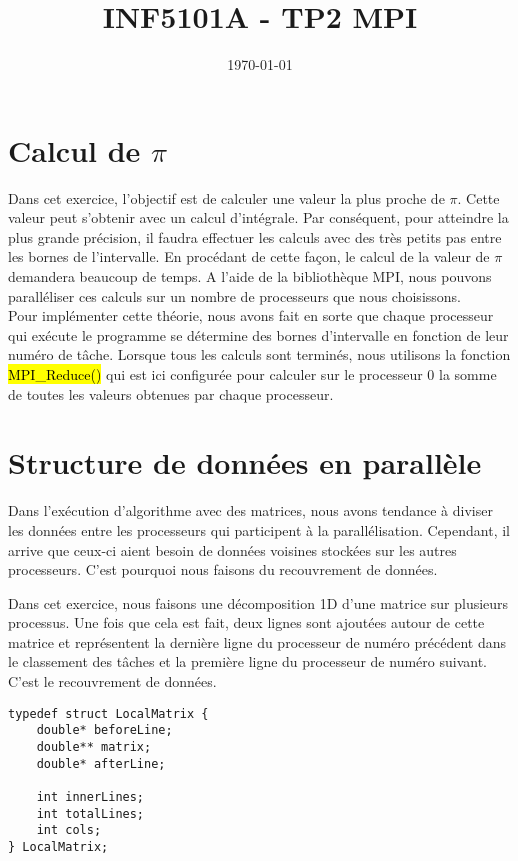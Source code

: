 \documentclass[a4paper,table]{article}
\title{INF5101A - TP2 MPI}
\date{\today}
\begin{document}
\maketitle
\newpage

\section{Calcul de $\pi$}

Dans cet exercice, l'objectif est de calculer une valeur la plus proche de
$\pi$. Cette valeur peut s'obtenir avec un calcul d'intégrale. Par conséquent,
pour atteindre la plus grande précision, il faudra effectuer les calculs avec
des très petits pas entre les bornes de l'intervalle. En procédant de cette
façon, le calcul de la valeur de $\pi$ demandera beaucoup de temps. A l'aide de
la bibliothèque MPI, nous pouvons paralléliser ces calculs sur un nombre de
processeurs que nous choisissons. \\

Pour implémenter cette théorie, nous avons fait en sorte que chaque processeur
qui exécute le programme se détermine des bornes d'intervalle en fonction de
leur numéro de tâche. Lorsque tous les calculs sont terminés, nous utilisons la
fonction \hl{MPI\_Reduce()} qui est ici configurée pour calculer sur le
processeur 0 la somme de toutes les valeurs obtenues par chaque processeur.

\section{Structure de données en parallèle}

Dans l'exécution d'algorithme avec des matrices, nous avons tendance à diviser
les données entre les processeurs qui participent à la parallélisation.
Cependant, il arrive que ceux-ci aient besoin de données voisines stockées sur
les autres processeurs. C'est pourquoi nous faisons du recouvrement de données.

Dans cet exercice, nous faisons une décomposition 1D d'une matrice sur plusieurs
processus. Une fois que cela est fait, deux lignes sont ajoutées autour
de cette matrice et représentent la dernière ligne du processeur de numéro
précédent dans le classement des tâches et la première ligne du processeur de
numéro suivant. C'est le recouvrement de données. \\

\begin{lstlisting}
typedef struct LocalMatrix {
    double* beforeLine;
    double** matrix;
    double* afterLine;

    int innerLines;
    int totalLines;
    int cols;
} LocalMatrix;
\end{lstlisting}
\
\end{document}
